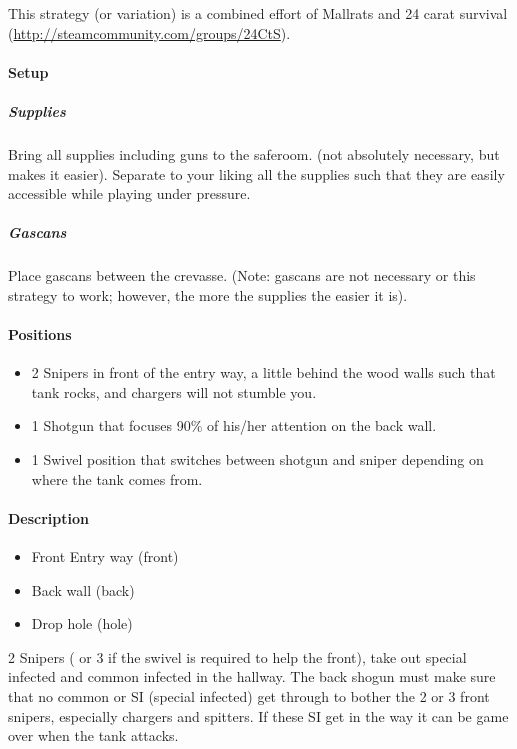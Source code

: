 This strategy (or variation) is a combined effort of Mallrats and 24 carat survival
(\url{http://steamcommunity.com/groups/24CtS}).

\paragraph{Setup}

\subparagraph{Supplies}

Bring all supplies including guns to the saferoom. (not absolutely necessary, but makes it easier). Separate to your liking all the supplies such that they are easily accessible while playing under pressure.

\subparagraph{Gascans}

Place gascans between the crevasse. (Note: gascans are not necessary or this strategy to work; however, the more the supplies the easier it is).

\paragraph{Positions}
\begin{itemize}
\item 2 Snipers in front of the entry way, a little behind the wood walls such that tank rocks, and chargers will not stumble you.
\item 1 Shotgun that focuses 90\% of his/her attention on the back wall.

\item 1 Swivel position that switches between shotgun and sniper depending on where the tank comes from.
\end{itemize}

\paragraph{Description}

\begin{itemize}
\item Front Entry way (front)
\item Back wall (back)
\item Drop hole (hole)
\end{itemize}

2 Snipers ( or 3 if the swivel is required to help the front), take out special infected and common infected in the hallway. The back shogun must make sure that no common or SI (special infected) get through to bother the 2 or 3 front snipers, especially chargers and spitters. If these SI get in the way it can be game over when the tank attacks.

